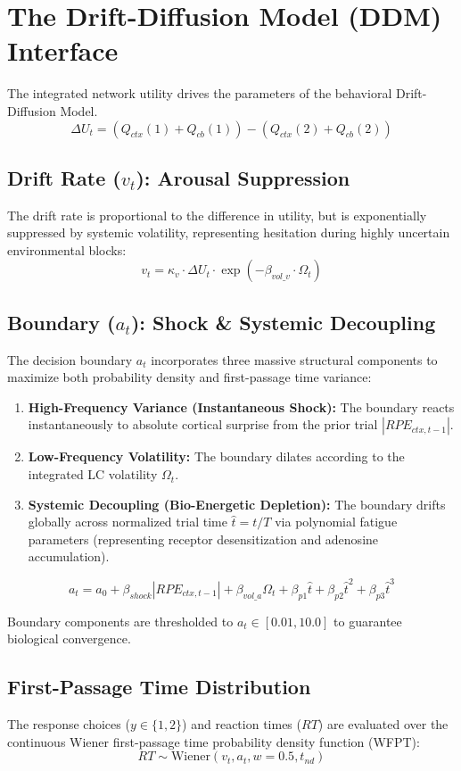 ﻿\documentclass[12pt]{article}
\begin{document}
\section{The Drift-Diffusion Model (DDM) Interface}
The integrated network utility drives the parameters of the behavioral Drift-Diffusion Model.
\begin{equation}
    \Delta U_t = (Q_{ctx}(1) + Q_{cb}(1)) - (Q_{ctx}(2) + Q_{cb}(2))
\end{equation}

\subsection{Drift Rate ($v_t$): Arousal Suppression}
The drift rate is proportional to the difference in utility, but is exponentially suppressed by systemic volatility, representing hesitation during highly uncertain environmental blocks:
\begin{equation}
    v_t = \kappa_v \cdot \Delta U_t \cdot \exp(-\beta_{vol\_v} \cdot \Omega_t)
\end{equation}

\subsection{Boundary ($a_t$): Shock \& Systemic Decoupling}
The decision boundary $a_t$ incorporates three massive structural components to maximize both probability density and first-passage time variance:
\begin{enumerate}
    \item \textbf{High-Frequency Variance (Instantaneous Shock):} The boundary reacts instantaneously to absolute cortical surprise from the prior trial $|RPE_{ctx, t-1}|$.
    \item \textbf{Low-Frequency Volatility:} The boundary dilates according to the integrated LC volatility $\Omega_t$.
    \item \textbf{Systemic Decoupling (Bio-Energetic Depletion):} The boundary drifts globally across normalized trial time $\hat{t} = t/T$ via polynomial fatigue parameters (representing receptor desensitization and adenosine accumulation).
\end{enumerate}
\begin{mdframed}[backgroundcolor=gray!10]
\begin{equation}
    a_t = a_0 + \beta_{shock} |RPE_{ctx, t-1}| + \beta_{vol\_a} \Omega_t + \beta_{p1} \hat{t} + \beta_{p2} \hat{t}^2 + \beta_{p3} \hat{t}^3
\end{equation}
\end{mdframed}
Boundary components are thresholded to $a_t \in [0.01, 10.0]$ to guarantee biological convergence.

\subsection{First-Passage Time Distribution}
The response choices ($y \in \{1, 2\}$) and reaction times ($RT$) are evaluated over the continuous Wiener first-passage time probability density function (WFPT):
\begin{equation}
    RT \sim \text{Wiener}(v_t, a_t, w=0.5, t_{nd})
\end{equation}
\end{document}
